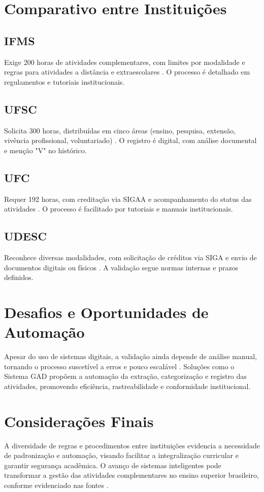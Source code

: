 \section{Comparativo entre Instituições}

\subsection{IFMS}
Exige 200 horas de atividades complementares, com limites por modalidade e regras para atividades a distância e extraescolares \cite{ufsc_sistemas_2024}. O processo é detalhado em regulamentos e tutoriais institucionais.

\subsection{UFSC}
Solicita 300 horas, distribuídas em cinco áreas (ensino, pesquisa, extensão, vivência profissional, voluntariado) \cite{ufsc_sistemas_2024}. O registro é digital, com análise documental e menção "V" no histórico.

\subsection{UFC}
Requer 192 horas, com creditação via SIGAA e acompanhamento do status das atividades \cite{bayde_ribeiro_sistemas_2022}. O processo é facilitado por tutoriais e manuais institucionais.

\subsection{UDESC}
Reconhece diversas modalidades, com solicitação de créditos via SIGA e envio de documentos digitais ou físicos \cite{udesc_atividades_2012}. A validação segue normas internas e prazos definidos.

\section{Desafios e Oportunidades de Automação}
Apesar do uso de sistemas digitais, a validação ainda depende de análise manual, tornando o processo suscetível a erros e pouco escalável \cite{bayde_ribeiro_sistemas_2022, udesc_atividades_2012}. Soluções como o Sistema GAD propõem a automação da extração, categorização e registro das atividades, promovendo eficiência, rastreabilidade e conformidade institucional.

\section{Considerações Finais}
 A diversidade de regras e procedimentos entre instituições evidencia a necessidade de padronização e automação, visando facilitar a integralização curricular e garantir segurança acadêmica. O avanço de sistemas inteligentes pode transformar a gestão das atividades complementares no ensino superior brasileiro, conforme evidenciado nas fontes \cite{ufsc_sistemas_2024, bayde_ribeiro_sistemas_2022, udesc_atividades_2012}.
